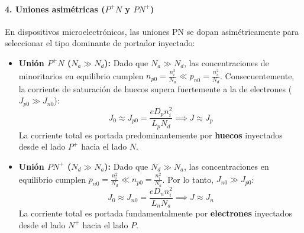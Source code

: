 \paragraph{4. Uniones asimétricas ($P^+ N$ y $P N^+$)}
En dispositivos microelectrónicos, las uniones PN se dopan asimétricamente para seleccionar el tipo dominante de portador inyectado:

\begin{itemize}
    \item \textbf{Unión $P^+ N$ ($N_a \gg N_d$):}
    Dado que $N_a \gg N_d$, las concentraciones de minoritarios en equilibrio cumplen $n_{p0} = \frac{n_i^2}{N_a} \ll p_{n0} = \frac{n_i^2}{N_d}$.
    Consecuentemente, la corriente de saturación de huecos supera fuertemente a la de electrones ($J_{p0} \gg J_{n0}$):
    \[
    J_0 \approx J_{p0} = \frac{e D_p n_i^2}{L_p N_d} \implies J \approx J_p
    \]
    La corriente total es portada predominantemente por \textbf{huecos} inyectados desde el lado $P^+$ hacia el lado $N$.

    \item \textbf{Unión $P N^+$ ($N_d \gg N_a$):}
    Dado que $N_d \gg N_a$, las concentraciones en equilibrio cumplen $p_{n0} = \frac{n_i^2}{N_d} \ll n_{p0} = \frac{n_i^2}{N_a}$.
    Por lo tanto, $J_{n0} \gg J_{p0}$:
    \[
    J_0 \approx J_{n0} = \frac{e D_n n_i^2}{L_n N_a} \implies J \approx J_n
    \]
    La corriente total es portada fundamentalmente por \textbf{electrones} inyectados desde el lado $N^+$ hacia el lado $P$.
\end{itemize}

